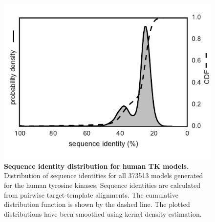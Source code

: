 \documentclass[aps,pre,twocolumn,nofootinbib,superscriptaddress,linenumbers]{revtex4-1}
\begin{document}
\begin{figure}[tb]
    \includegraphics[width=1.0\columnwidth]{seqid_dist/seqid_dist.pdf}

    \caption{{\bf Sequence identity distribution for human TK models.}
    Distribution of sequence identities for all \num{373513} models generated for the human tyrosine kinases.
    Sequence identities are calculated from pairwise target-template alignments.
    The cumulative distribution function is shown by the dashed line.
    The plotted distributions have been smoothed using kernel density estimation.
    }
  \label{figure:sequence-identity-distribution}
\end{figure}

\end{document}
